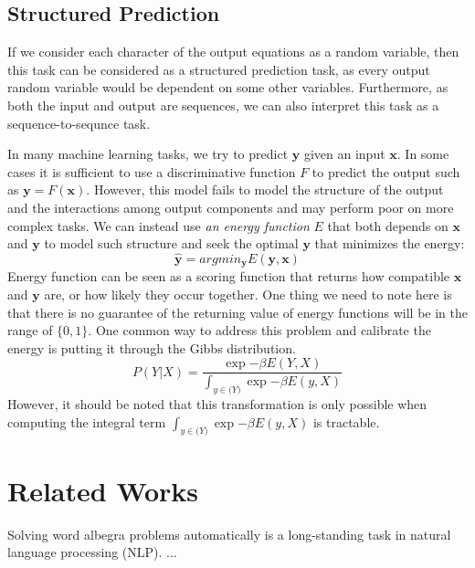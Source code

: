 \documentclass[11pt,letterpaper]{article}
\begin{document}
\subsection{Structured Prediction}
If we consider each character of the output equations as a random variable, then this task can be considered as a structured prediction task, as every output random variable would be dependent on some other variables. Furthermore, as both the input and output are sequences, we can also interpret this task as a sequence-to-sequnce task.

In many machine learning tasks, we try to predict $\textbf{y}$ given an input $\textbf{x}$. In some cases it is sufficient to use a discriminative function $F$ to predict the output such as $\textbf{y} = F( \textbf{x} )$. However, this model fails to model the structure of the output and the interactions among output components and may perform poor on more complex tasks. We can instead use \textit{an energy function} $E$ that both depends on $\textbf{x}$ and $\textbf{y}$ to model such structure and seek the optimal $\textbf{y}$ that minimizes the energy:
\begin{equation}
\hat{\mathbf{y}} = argmin_{\mathbf{y}} E( \mathbf{y}, \mathbf{x} )%
\label{ebm0}
\end{equation}
Energy function can be seen as a scoring function that returns how compatible $\mathbf{x}$ and $\mathbf{y}$ are, or how likely they occur together.
One thing we need to note here is that there is no guarantee of the returning value of energy functions will be in the range of $\{ 0, 1\}$. One common way to address this problem and calibrate the energy is putting it through the Gibbs distribution.
\begin{equation}
P(Y|X) = \frac{ \exp{- \beta E(Y, X)} }{\int_{y \in \mathcal(Y)} \exp{- \beta E(y, X)}  }
\label{ebm1}
\end{equation}
However, it should be noted that this transformation is only possible when computing the integral term $\int_{y \in \mathcal(Y)} \exp{- \beta E(y, X)}$ is tractable.
\section{Related Works}
Solving word albegra problems automatically is a long-standing task in natural language processing (NLP). ...
\end{document}
